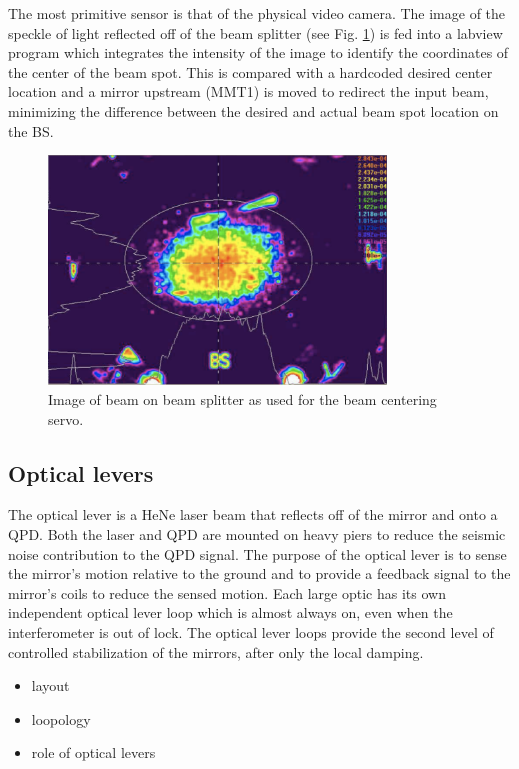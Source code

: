 The most primitive sensor is that of the physical video camera. The
image of the speckle of light reflected off of the beam splitter (see
Fig. \ref{fig:BCS}) is fed into a labview program which integrates the
intensity of the image to identify the coordinates of the center of
the beam spot. This is compared with a hardcoded desired center
location and a mirror upstream (MMT1) is moved to redirect the input
beam, minimizing the difference between the desired and actual beam
spot location on the BS.

\begin{figure}
\begin{centering}
\includegraphics[width=0.8\textwidth]{figures/BCSspiricon.pdf}
\caption{Image of beam on beam splitter as used for the beam centering servo.}
\label{fig:BCS}
\end{centering}
\end{figure}

\subsection{Optical levers}
The optical lever is a HeNe laser beam that reflects off of the mirror
and onto a QPD. Both the laser and QPD are mounted on heavy piers to
reduce the seismic noise contribution to the QPD signal. The purpose
of the optical lever is to sense the mirror's motion relative to the
ground and to provide a feedback signal to the mirror's coils to reduce
the sensed motion. Each large optic has its own independent optical
lever loop which is almost always on, even when the interferometer is
out of lock. The optical lever loops provide the second level of
controlled stabilization of the mirrors, after only the local
damping. 


\begin{itemize}
\item layout
\item loopology
\item role of optical levers
\end{itemize}

